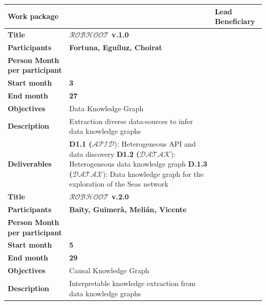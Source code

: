 \documentclass[11pt, a4paper]{article} %
\begin{document}
{ %
\begin{table}[h!]
\begin{center}
  \begin{tabular}{|m{3cm} || m{12cm} || m{1cm}|}
    \hline\hline\hline
    \rowcolor{lightpink!30}
    {\bf Work package} & & {\bf Lead Beneficiary} \\
    \hline
    \rowcolor{piggypink!20}
    {\bf Title} & {\bf $\mathcal{ROBHOOT}$ v.1.0} &  \\
    \hline
    \rowcolor{piggypink!20}
    {\bf Participants} & {\bf Fortuna, Egu\'iluz, Choirat} & \\
    \hline
    \rowcolor{piggypink!20}
    {\bf Person Month per participant} & & \\
    \hline
    \rowcolor{piggypink!20}
    {\bf Start month} & {\bf 3} & \\
    \hline
    \rowcolor{piggypink!20}
    {\bf End month} & {\bf 27} & \\
    \hline
    \rowcolor{piggypink!20}
    {\bf Objectives} & Data Knowledge Graph & \\
    \hline
    \rowcolor{piggypink!20}
    {\bf Description} & Extraction diverse data-sources to infer data knowledge graphs & \\
    \hline
    \rowcolor{piggypink!20}
    {\bf Deliverables} & {\bf D1.1 ($\mathcal{APID}$}): Heterogeneous API and data discovery
                         {\bf D1.2 ($\mathcal{DATAK}$}): Heterogeneous data knowledge graph
                         {\bf D.1.3 ($\mathcal{DATAX}$}): Data knowledge graph for the exploration of the Seas network & \\
    \hline\hline\hline
    \rowcolor{piggypink!20}
    {\bf Title} & {\bf $\mathcal{ROBHOOT}$ v.2.0} &  \\
    \hline
    \rowcolor{piggypink!20}
    {\bf Participants} & {\bf Baity, Guimer\`a, Meli\'an, Vicente} & \\
    \hline
    \rowcolor{piggypink!20}
    {\bf Person Month per participant} & & \\
    \hline
    \rowcolor{piggypink!20}
    {\bf Start month} & {\bf 5} & \\
    \hline
    \rowcolor{piggypink!20}
    {\bf End month} & {\bf 29} & \\
    \hline
    \rowcolor{piggypink!20}
    {\bf Objectives} & Causal Knowledge Graph & \\
    \hline
    \rowcolor{piggypink!20}
    {\bf Description} & Interpretable knowledge extraction from data knowledge graphs & \\

\end{tabular}
\end{center}
\end{table}}
\end{document}
